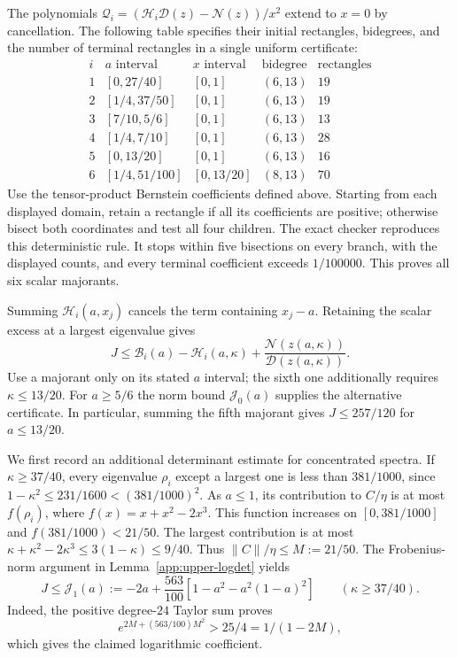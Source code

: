 \documentclass[11pt,a4paper]{article}
\numberwithin{equation}{section}
\begin{document}
The polynomials
$\mathcal Q_i=(\mathcal H_i\mathcal D(z)-\mathcal N(z))/x^2$
extend to $x=0$ by cancellation. The following table specifies their
initial rectangles, bidegrees, and the number of terminal rectangles
in a single uniform certificate:
\[
\begin{array}{c|c|c|c|r}
 i&a\text{ interval}&x\text{ interval}&\text{bidegree}&\text{rectangles}\\\hline
 1&[0,27/40]&[0,1]&(6,13)&19\\
 2&[1/4,37/50]&[0,1]&(6,13)&19\\
 3&[7/10,5/6]&[0,1]&(6,13)&13\\
 4&[1/4,7/10]&[0,1]&(6,13)&28\\
 5&[0,13/20]&[0,1]&(6,13)&16\\
 6&[1/4,51/100]&[0,13/20]&(8,13)&70
\end{array}
\]
Use the tensor-product Bernstein coefficients defined above.
Starting from each displayed domain, retain a
rectangle if all its coefficients are positive; otherwise bisect both
coordinates and test all four children. The exact checker reproduces
this deterministic rule. It stops within five bisections on every branch,
with the displayed counts, and every terminal coefficient exceeds
$1/100000$. This proves all six scalar majorants.

Summing $\mathcal H_i(a,x_j)$ cancels the term containing $x_j-a$.
Retaining the scalar excess at a largest eigenvalue gives
\begin{equation}\label{eq:k1-joint-J}
 J\le\mathcal B_i(a)-\mathcal H_i(a,\kappa)
       +\frac{\mathcal N(z(a,\kappa))}{\mathcal D(z(a,\kappa))}.
\end{equation}
Use a majorant only on its stated $a$ interval; the sixth one additionally
requires $\kappa\le13/20$. For $a\ge5/6$ the norm bound
$\mathcal J_0(a)$ supplies the alternative certificate.
In particular, summing the fifth majorant gives $J\le257/120$ for
$a\le13/20$.

We first record an additional determinant estimate for concentrated spectra.
If $\kappa\ge37/40$, every eigenvalue $\rho_i$ except a largest one is
less than $381/1000$, since
$1-\kappa^2\le231/1600<(381/1000)^2$.
As $a\le1$, its contribution to $C/\eta$ is at most
$f(\rho_i)$, where $f(x)=x+x^2-2x^3$.
This function increases on $[0,381/1000]$ and
$f(381/1000)<21/50$.
The largest contribution is at most
$\kappa+\kappa^2-2\kappa^3\le3(1-\kappa)\le9/40$.
Thus $\|C\|/\eta\le M:=21/50$.
The Frobenius-norm argument in Lemma~\ref{app:upper-logdet} yields
\begin{equation}\label{eq:general-high-kappa-J}
 J\le\mathcal J_1(a):=-2a+\frac{563}{100}
                 [1-a^2-a^2(1-a)^2]
 \qquad(\kappa\ge37/40).
\end{equation}
Indeed, the positive degree-$24$ Taylor sum proves
\[
 e^{2M+(563/100)M^2}>25/4=1/(1-2M),
\]
which gives the claimed logarithmic coefficient.
\end{document}

